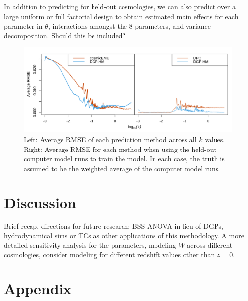 \documentclass[11pt]{article}
\begin{document}
In addition to predicting for held-out cosmologies, we can also predict over a large uniform or full factorial design to obtain estimated main effects for each parameter in $\theta$, interactions amongst the 8 parameters, and variance decomposition. Should this be included?

\begin{figure}[ht]
    \centering
    \includegraphics[width=6in]{rmse_by_k.png}
    \caption{Left: Average RMSE of each prediction method across all $k$ values. Right: Average RMSE for each method when using the held-out computer model runs to train the model. In each case, the truth is assumed to be the weighted average of the computer model runs.}
    \label{fig:plot_rmse_k}
\end{figure}


\section{Discussion}
\label{sec:disc}

Brief recap, directions for future research: BSS-ANOVA in lieu of DGPs, hydrodynamical sims or TCs as other applications of this methodology. A more detailed sensitivity analysis for the parameters, modeling $W$ across different cosmologies, consider modeling for different redshift values other than $z=0$.

\section{Appendix}
\label{sec:apdx}
\end{document}
